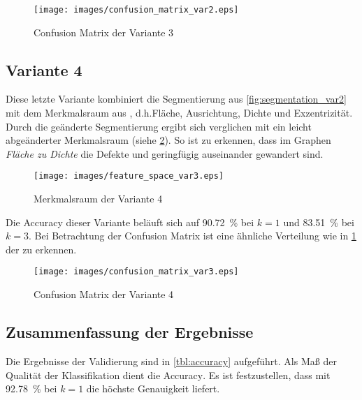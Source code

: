 \begin{figure}[htb]
    \centering
    \texttt{[image: images/confusion\_matrix\_var2.eps]}
    \caption{\foreignlanguage{english}{Confusion Matrix} der Variante 3\label{fig:confusion_matrix_var2}}
\end{figure}

\FloatBarrier{}

\subsection{Variante 4\label{sct:variant3}}

Diese letzte Variante kombiniert die Segmentierung aus \cref{fig:segmentation_var2} mit dem Merkmalsraum aus , d.h.\@ Fläche, Ausrichtung, Dichte und Exzentrizität. Durch die geänderte Segmentierung ergibt sich verglichen mit  ein leicht abgeänderter Merkmalsraum (siehe \cref{fig:feature_space_var3}). So ist zu erkennen, dass im Graphen \emph{Fläche zu Dichte} die Defekte  und  geringfügig auseinander gewandert sind.

\begin{figure}[htb]
    \centering
    \texttt{[image: images/feature\_space\_var3.eps]}
    \caption{Merkmalsraum der Variante 4\label{fig:feature_space_var3}}
\end{figure}

Die \foreignlanguage{english}{Accuracy} dieser Variante beläuft sich auf \SI{90.72}{\percent} bei \(k = 1\) und \SI{83.51}{\percent} bei \(k = 3\). Bei Betrachtung der \foreignlanguage{english}{Confusion Matrix} ist eine ähnliche Verteilung wie in \cref{fig:confusion_matrix_var2} der  zu erkennen.

\begin{figure}[htb]
    \centering
    \texttt{[image: images/confusion\_matrix\_var3.eps]}
    \caption{\foreignlanguage{english}{Confusion Matrix} der Variante 4\label{fig:confusion_matrix_var3}}
\end{figure}

\FloatBarrier{}

\subsection{Zusammenfassung der Ergebnisse}

Die Ergebnisse der Validierung sind in \cref{tbl:accuracy} aufgeführt. Als Maß der Qualität der Klassifikation dient die \foreignlanguage{english}{Accuracy}. Es ist festzustellen, dass  mit \SI{92.78}{\percent} bei \(k = 1\) die höchste Genauigkeit liefert.

